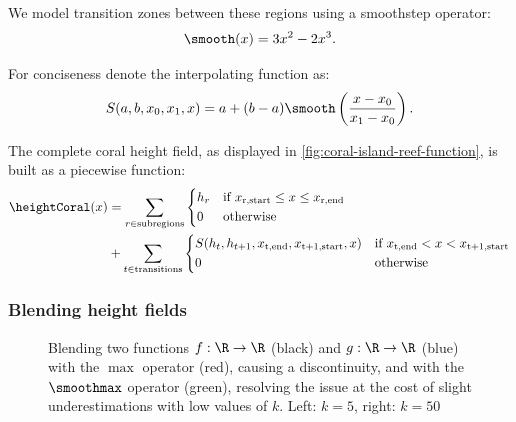 We model transition zones between these regions using a smoothstep operator:
\begin{align}
    \smooth(x) = 3x^2 - 2x^3.
\end{align}

For conciseness denote the interpolating function as:
\begin{align}
    S(a, b, x_0, x_1, x) = a + (b-a) \smooth\left(\frac{x - x_0}{x_1 - x_0}\right).
\end{align}

The complete coral height field, as displayed in \cref{fig:coral-island-reef-function}, is built as a piecewise function:
\begin{align}
    \label{eq:coral-island-full-reef-function}
    \heightCoral(x) &= \sum_{r \in \text{subregions}}{
    \begin{dcases}
        h_r & \text{if } x_{\text{r,start}} \leq x \leq x_{\text{r,end}} \\
        0 & \text{otherwise}
    \end{dcases}
    } \nonumber \\ 
    &+
    \sum_{t \in \text{transitions}} {
        \begin{dcases}
            S(h_{t}, h_{t+1}, x_{\text{t,end}}, x_{\text{t+1,start}}, x) & \text{if } x_{\text{t,end}} < x < x_{\text{t+1,start}} \\
            0 & \text{otherwise}
        \end{dcases}
    }
\end{align}

\subsubsection{Blending height fields}
\label{subsubsec:height-functions-blending}

\begin{figure}[H]
    \caption{Blending two functions $f: \R \to \R$ (black) and $g: \R \to \R$ (blue) with the $\max$ operator (red), causing a discontinuity, and with the $\smoothmax$ operator (green), resolving the issue at the cost of slight underestimations with low values of $k$. Left: $k=5$, right: $k=50$}
    \label{fig:coral-island-blend-function-island}
\end{figure}

